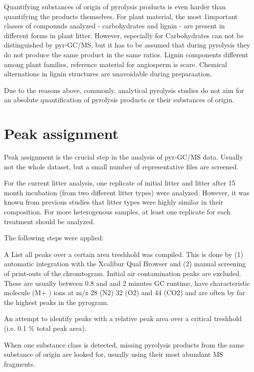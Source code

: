 Quantifying substances of origin of pyrolysis products is even harder than quantifying the products themselves. For plant material, the most 1important classes of compounds analyzed - carbohydrates and lignin - are present in different forms in plant litter. However, especially for Carbohydrates can not be distinguished by pyr-GC/MS, but it has to be assumed that during pyrolysis they do not produce the same product in the same ratios. Lignin components different among plant families, reference material for angiosperm is scare. Chemical alternations in lignin structures are unavoidable during preparaation.


Due to the reasons above, commonly, analytical pyrolysis studies do not aim for an absolute quantification of pyrolysis products or their substances of origin. 



\section{Peak assignment}

Peak assignment is the crucial step in the analysis of pyr-GC/MS data. Usually not the whole dataset, but a small number of representative files are screened. 

For the current litter analysis, one replicate of initial litter and litter after 15 month incubation (from two different litter types) were analyzed. However, it was known from previous studies that litter types were highly similar in their composition. For more heterogenous samples, at least one replicate for each treatment should be analyzed. 

The following steps were applied:

A List all peaks over a certain area treshhold was compiled. This is done by (1) automatic integration with the Xcalibur Qual Browser and (2) manual screening of print-outs of the chromtogram. Initial air contamination peaks are excluded. These are usually between 0.8 and and 2 minutes GC runtime, have characteristic molecule (M+ ) ions at m/z 28 (N2) 32 (O2) and 44 (CO2) and are often by far the highest peaks in the pyrogram. 

An attempt to identify peaks with a relative peak area over a critical treshhold (i.e. 0.1 \% total peak area).

When one substance class is detected, missing pyrolysis products from the same substance of origin are looked for, usually using their most abundant MS fragments.

